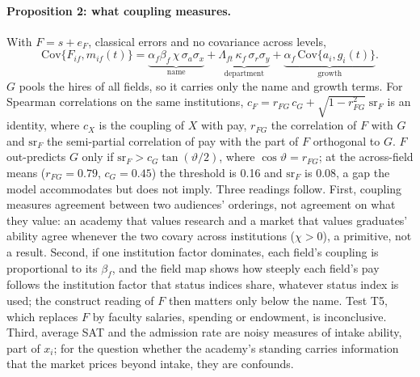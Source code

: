\documentclass[11pt]{article}
\begin{document}
\paragraph{Proposition 2: what coupling measures.} With $F=s+e_F$, classical errors and no covariance across
levels,
\begin{equation}\label{eq:theory-decomp}
\mathrm{Cov}\{F_{if},m_{if}(t)\}=\underbrace{\alpha_f\beta_f\,\chi\,\sigma_a\sigma_x}_{\text{name}}
+\underbrace{\Lambda_{ft}\,\kappa_f\,\sigma_r\sigma_y}_{\text{department}}
+\underbrace{\alpha_f\,\mathrm{Cov}\{a_i,g_{i}(t)\}}_{\text{growth}} .
\end{equation}
$G$ pools the hires of all fields, so it carries only the name and growth terms. For Spearman correlations on the
same institutions, $c_F=r_{FG}\,c_G+\sqrt{1-r_{FG}^2}\;\mathrm{sr}_F$ is an identity, where $c_X$ is the coupling
of $X$ with pay, $r_{FG}$ the correlation of $F$ with $G$ and $\mathrm{sr}_F$ the semi-partial correlation of pay
with the part of $F$ orthogonal to $G$. $F$ out-predicts $G$ only if $\mathrm{sr}_F>c_G\tan(\vartheta/2)$, where
$\cos\vartheta=r_{FG}$; at the across-field means ($r_{FG}=0.79$, $c_G=0.45$) the threshold is 0.16 and
$\mathrm{sr}_F$ is 0.08, a gap the model accommodates but does not imply.
Three readings follow. First, coupling measures agreement between two audiences' orderings, not agreement on what
they value: an academy that values research and a market that values graduates' ability agree whenever the two
covary across institutions ($\chi>0$), a primitive, not a result. Second, if one institution factor dominates,
each field's coupling is proportional to its $\beta_f$, and the field map shows how steeply each field's pay
follows the institution factor that status indices share, whatever status index is used; the construct reading of
$F$ then matters only below the name. Test T5, which replaces $F$ by faculty salaries, spending or endowment, is inconclusive. Third, average SAT and the admission rate are noisy measures of intake ability, part of $x_i$;
for the question whether the academy's standing carries information that the market prices beyond intake, they
are confounds.
\end{document}
